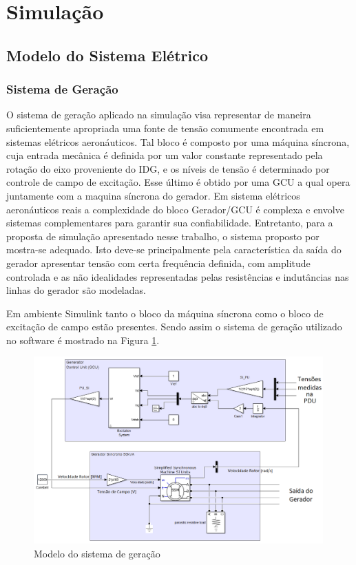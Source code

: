 \section{Simulação}

\subsection{Modelo do Sistema Elétrico}

\subsubsection{Sistema de Geração} 

O sistema de geração aplicado na simulação visa representar de maneira suficientemente apropriada uma fonte de tensão comumente encontrada em sistemas elétricos aeronáuticos. Tal bloco é composto por uma máquina síncrona, cuja entrada mecânica é definida por um valor constante representado pela rotação do eixo proveniente do IDG, e os níveis de tensão é determinado por controle de campo de excitação. Esse último é obtido por uma GCU a qual opera juntamente com a maquina síncrona do gerador. Em sistema elétricos aeronáuticos reais a complexidade do bloco Gerador/GCU é complexa e envolve sistemas complementares para garantir sua confiabilidade. Entretanto, para a proposta de simulação apresentado nesse trabalho, o sistema proposto por \cite{Olivier} mostra-se adequado. Isto deve-se principalmente pela característica da saída do gerador apresentar tensão com certa frequência definida, com amplitude controlada e as não idealidades representadas pelas resistências e indutâncias nas linhas do gerador são modeladas.

Em ambiente Simulink tanto o bloco da máquina síncrona como o bloco de excitação de campo estão presentes. Sendo assim o sistema de geração utilizado no software é mostrado na Figura \ref{fig:GEN_GCU.png}.

\begin{figure}[!htb] %
	\centering
	\includegraphics[width=0.99\textwidth]{Cap4/Figuras/GEN_GCU.png}
	\caption{Modelo do sistema de geração}
	\label{fig:GEN_GCU.png}
\end{figure}

